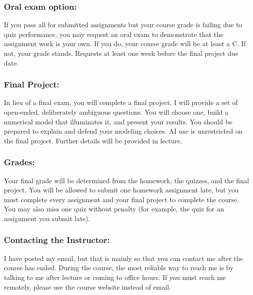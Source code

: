 \documentclass[12pt]{article}
\begin{document}
\subsubsection*{Oral exam option:}
If you pass all for submitted assignments but
your course grade is failing due to quiz performance, you may request
an oral exam to demonstrate that the assignment work is your own.  If
you do, your course grade will be at least a C.  If not, your grade
stands.  Requests at least one week before the final project due date.

\subsubsection*{Final Project:}
In lieu of a final exam, you will complete
a final project.  I will provide a set of open-ended, deliberately
ambiguous questions.  You will choose one, build a numerical model
that illuminates it, and present your results.  You should be prepared
to explain and defend your modeling choices.  AI use is unrestricted
on the final project.  Further details will be provided in
lecture.

\subsubsection*{Grades:}

Your final grade will be determined from the homework, the quizzes,
and the final project.  You will be allowed to submit one homework
assignment late, but you must complete every assignment and your final
project to complete the course.  You may also miss one quiz without
penalty (for example, the quiz for an assignment you submit late).

\subsubsection*{Contacting the Instructor:}

I have posted my email, but that is mainly so that you can contact me
after the course has ended.  During the course, the most reliable way
to reach me is by talking to me after lecture or coming to office
hours.  If you must reach me remotely, please use the course website
instead of email.\\[5pt]
\end{document}
